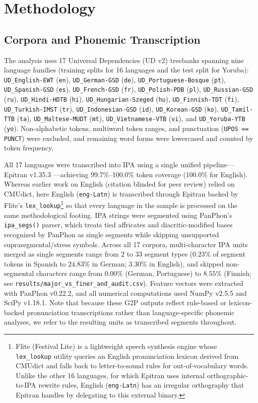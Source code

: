 \documentclass{interact}
\begin{document}
\section{Methodology}
\subsection{Corpora and Phonemic Transcription}
The analysis uses 17 Universal Dependencies (UD v2) treebanks \citep{nivre2020universal} spanning nine language families (training splits for 16 languages and the test split for Yoruba): \texttt{UD\_English-EWT} (\texttt{en}), \texttt{UD\_German-GSD} (\texttt{de}), \texttt{UD\_Portuguese-Bosque} (\texttt{pt}), \texttt{UD\_Spanish-GSD} (\texttt{es}), \texttt{UD\_French-GSD} (\texttt{fr}), \texttt{UD\_Polish-PDB} (\texttt{pl}), \texttt{UD\_Russian-GSD} (\texttt{ru}), \texttt{UD\_Hindi-HDTB} (\texttt{hi}), \texttt{UD\_Hungarian-Szeged} (\texttt{hu}), \texttt{UD\_Finnish-TDT} (\texttt{fi}), \texttt{UD\_Turkish-IMST} (\texttt{tr}), \texttt{UD\_Indonesian-GSD} (\texttt{id}), \texttt{UD\_Korean-GSD} (\texttt{ko}), \texttt{UD\_Tamil-TTB} (\texttt{ta}), \texttt{UD\_Maltese-MUDT} (\texttt{mt}), \texttt{UD\_Vietnamese-VTB} (\texttt{vi}), and \texttt{UD\_Yoruba-YTB} (\texttt{yo}). Non-alphabetic tokens, multiword token ranges, and punctuation (\texttt{UPOS == PUNCT}) were excluded, and remaining word forms were lowercased and counted by token frequency.

All 17 languages were transcribed into IPA using a single unified pipeline---Epitran v1.35.3 \citep{mortensen2018epitran}---achieving 99.7\%--100.0\% token coverage (100.0\% for English). Whereas earlier work on English (citation blinded for peer review) relied on CMUdict, here English (\texttt{eng-Latn}) is transcribed through Epitran backed by Flite's \texttt{lex\_lookup}\footnote{Flite (Festival Lite) is a lightweight speech synthesis engine whose \texttt{lex\_lookup} utility queries an English pronunciation lexicon derived from CMUdict and falls back to letter-to-sound rules for out-of-vocabulary words. Unlike the other 16 languages, for which Epitran uses internal orthographic-to-IPA rewrite rules, English (\texttt{eng-Latn}) has an irregular orthography that Epitran handles by delegating to this external binary.} so that every language in the sample is processed on the same methodological footing. IPA strings were segmented using PanPhon's \texttt{ipa\_segs()} parser, which treats tied affricates and diacritic-modified bases recognized by PanPhon as single segments while skipping unsupported suprasegmental/stress symbols. Across all 17 corpora, multi-character IPA units merged as single segments range from $2$ to $33$ segment types ($0.23\%$ of segment tokens in Spanish to $24.83\%$ in German; $3.30\%$ in English), and skipped non-segmental characters range from $0.00\%$ (German, Portuguese) to $8.55\%$ (Finnish; see \texttt{results/major\_vs\_finer\_and\_audit.csv}). Feature vectors were extracted with PanPhon v0.22.2, and all numerical computations used NumPy v2.5.5 and SciPy v1.18.1. Note that because these G2P outputs reflect rule-based or lexicon-backed pronunciation transcriptions rather than language-specific phonemic analyses, we refer to the resulting units as transcribed segments throughout.
\end{document}
